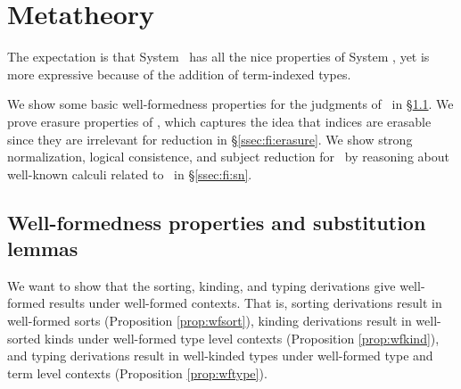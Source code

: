 \section{Metatheory}\label{sec:fi:theory}
The expectation is that System \Fi\ has all the nice properties of System \Fw,
yet is more expressive because of the addition of term-indexed types.

We show some basic well-formedness properties for
the judgments of \Fi\ in \S\ref{ssec:fi:wf}.
We prove erasure properties of \Fi, which captures the idea that indices are
erasable since they are irrelevant for reduction in \S\ref{ssec:fi:erasure}.
We show strong normalization, logical consistence, and subject reduction for
\Fi\ by reasoning about well-known calculi related to \Fi\ in \S\ref{ssec:fi:sn}.

\subsection{Well-formedness properties and substitution lemmas}
\label{ssec:fi:wf}
We want to show that the sorting, kinding, and typing derivations give
well-formed results under well-formed contexts. That is, sorting derivations
result in well-formed sorts (Proposition \ref{prop:wfsort}),
kinding derivations result in well-sorted kinds under well-formed
type level contexts (Proposition \ref{prop:wfkind}), and typing derivations
result in well-kinded types under well-formed type and term level contexts
(Proposition \ref{prop:wftype}).

